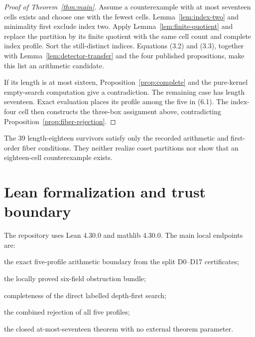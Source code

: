 \documentclass[11pt]{article}
\theoremstyle{definition}
\newcommand{\leanname}[1]{\nolinkurl{#1}}
\begin{document}
\begin{proof}[Proof of Theorem~\ref{thm:main}]
Assume a counterexample with at most seventeen cells exists and choose one
with the fewest cells. Lemma~\ref{lem:index-two} and minimality first exclude
index two. Apply Lemma~\ref{lem:finite-quotient} and replace the partition by
its finite quotient with the same cell count and complete index profile. Sort
the still-distinct indices. Equations (3.2) and (3.3), together with
Lemma~\ref{lem:detector-transfer} and the four published propositions, make
this list an arithmetic candidate.

If its length is at most sixteen, Proposition~\ref{prop:complete} and the
pure-kernel empty-search computation give a contradiction. The remaining case
has length seventeen. Exact evaluation places its profile among the five in
(6.1). The index-four cell then constructs the three-box assignment above,
contradicting Proposition~\ref{prop:fiber-rejection}.
\end{proof}

The 39 length-eighteen survivors satisfy only the recorded arithmetic and
first-order fiber conditions. They neither realize coset partitions nor show
that an eighteen-cell counterexample exists.

\section{Lean formalization and trust boundary}\label{sec:trust}

The repository uses Lean 4.30.0 and mathlib 4.30.0. The main local endpoints
are:
\begin{description}[style=nextline,leftmargin=8mm]
\item[\leanname{checked_seventeen_survivors}]
the exact five-profile arithmetic boundary from the split D0--D17
certificates;
\item[\leanname{localMargolisSchnabelFacts}]
the locally proved six-field obstruction bundle;
\item[\leanname{kernelFiberDFS4_complete_of_orderedAssignment}]
completeness of the direct labelled depth-first search;
\item[\leanname{seventeenIndexFourAssignmentObstruction_kernel}]
the combined rejection of all five profiles;
\item[\leanname{erdos274AtMostSeventeen}]
the closed at-most-seventeen theorem with no external theorem parameter.
\end{description}
\end{document}
